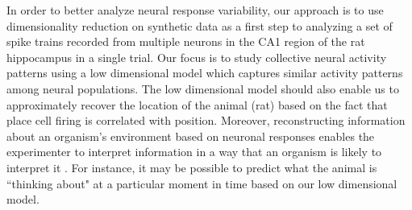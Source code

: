 In order to better analyze neural response variability, our approach is to use dimensionality reduction on synthetic data as a first step to analyzing a set of spike trains recorded from multiple neurons in the CA1 region of the rat hippocampus in a single trial.
Our focus is to study collective neural activity patterns using a low dimensional model which captures similar activity patterns among neural populations. The low dimensional model should also enable us to approximately recover the location of the animal (rat) based on the fact that place cell firing is correlated with position.
Moreover, reconstructing information about an organism's environment based on neuronal responses enables the experimenter to interpret information in a way that an organism is likely to interpret it \cite{Bialek1992}. For instance, it may be possible to predict what the animal is ``thinking about" at a particular moment in time based on our low dimensional model.







































%











